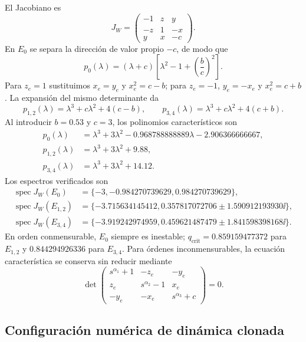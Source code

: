 El Jacobiano es
\begin{equation}
 J_W=\begin{pmatrix}
 -1&z&y\\-z&1&-x\\y&x&-c
 \end{pmatrix}.
\end{equation}
En $E_0$ se separa la dirección de valor propio $-c$, de modo que
\[
 p_0(\lambda)=(\lambda+c)
 \left[\lambda^2-1+\left(\frac bc\right)^2\right].
\]
Para $z_e=1$ sustituimos $x_e=y_e$ y $x_e^2=c-b$; para $z_e=-1$,
$y_e=-x_e$ y $x_e^2=c+b$. La expansión del mismo determinante da
\[
 p_{1,2}(\lambda)=\lambda^3+c\lambda^2+4(c-b),\qquad
 p_{3,4}(\lambda)=\lambda^3+c\lambda^2+4(c+b).
\]
Al introducir $b=0.53$ y $c=3$, los polinomios característicos son
\begin{align}
 p_0(\lambda)&=\lambda^3+3\lambda^2
 -0.968788888889\lambda-2.906366666667,\\
 p_{1,2}(\lambda)&=\lambda^3+3\lambda^2+9.88,\\
 p_{3,4}(\lambda)&=\lambda^3+3\lambda^2+14.12.
\end{align}
Los espectros verificados son
\begin{align}
 \operatorname{spec}J_W(E_0)&=
 \{-3,-0.984270739629,0.984270739629\},\\
 \operatorname{spec}J_W(E_{1,2})&=
 \{-3.715634145412,0.357817072706
 \pm1.590912193930\ii\},\\
 \operatorname{spec}J_W(E_{3,4})&=
 \{-3.919242974959,0.459621487479
 \pm1.841598398168\ii\}.
\end{align}
En orden conmensurable, \(E_0\) siempre es inestable;
\(q_{\mathrm{crit}}=0.859159477372\) para \(E_{1,2}\) y
\(0.844294926336\) para \(E_{3,4}\). Para órdenes inconmensurables, la ecuación
característica se conserva sin reducir mediante
\begin{equation}
 \det\begin{pmatrix}
 s^{\alpha_1}+1&-z_e&-y_e\\
 z_e&s^{\alpha_2}-1&x_e\\
 -y_e&-x_e&s^{\alpha_3}+c
 \end{pmatrix}=0.
\end{equation}

\subsection{Configuración numérica de dinámica clonada}

